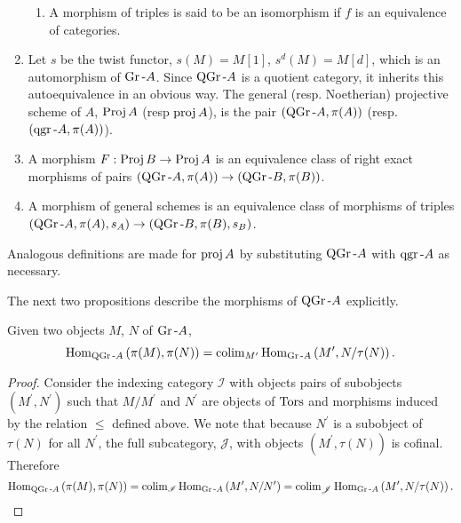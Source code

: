 \documentclass[dissertation.tex]{subfiles}
\begin{document}
\begin{defn}
\begin{enumerate}
\begin{enumerate}
    \item
      A morphism of triples is said to be an isomorphism if $f$ is an equivalence of categories.
    \end{enumerate}
  \item
    Let $s$ be the twist functor, $s(M) = M[1]$, $s^d(M) = M[d]$, which is an automorphism of $\operatorname{Gr}\text{-}A$.
    Since $\operatorname{QGr}\text{-}A$ is a quotient category, it inherits this autoequivalence in an obvious way.
    The general (resp. Noetherian) projective scheme of $A$, $\operatorname{Proj} A$ (resp $\operatorname{proj} A$), is the pair $(\operatorname{QGr}\text{-}A, \pi(A))$ (resp. $(\operatorname{qgr}\text{-}A, \pi(A))$).
  \item
    A morphism $F :\operatorname{Proj} B \rightarrow \operatorname{Proj} A$ is an equivalence class of right exact morphisms of pairs $(\operatorname{QGr}\text{-}A, \pi(A)) \rightarrow (\operatorname{QGr}\text{-}B, \pi(B))$.
  \item
    A morphism of general schemes is an equivalence class of morphisms of triples $(\operatorname{QGr}\text{-}A, \pi(A), s_A) \rightarrow (\operatorname{QGr}\text{-}B, \pi(B), s_B)$.
  \end{enumerate}
  Analogous definitions are made for $\operatorname{proj} A$ by substituting $\operatorname{QGr}\text{-}A$ with $\operatorname{qgr}\text{-}A$ as necessary.
\end{defn}

The next two propositions describe the morphisms of $\operatorname{QGr}\text{-}A$ explicitly.

\begin{prop}
  Given two objects $M$, $N$ of $\operatorname{Gr}\text{-}A$, 
  $$\operatorname{Hom}_{\operatorname{QGr}\text{-}A}\left(\pi(M), \pi(N)\right) = \operatorname{colim}_{M^\prime}\operatorname{Hom}_{\operatorname{Gr}\text{-}A}\left(M^\prime, N/\tau(N)\right).$$
  
  \begin{proof}
    Consider the indexing category $\mathscr{I}$ with objects pairs of subobjects $(M^\prime, N^\prime)$ such that $M/M^\prime$ and $N^\prime$ are objects of $\operatorname{Tors}$ and morphisms induced by the relation $\leq$ defined above.
    We note that because $N^\prime$ is a subobject of $\tau(N)$ for all $N^\prime$, the full subcategory, $\mathscr{J}$, with objects $(M^\prime, \tau(N))$ is cofinal.
    Therefore
    $$\operatorname{Hom}_{\operatorname{QGr}\text{-}A}\left(\pi(M), \pi(N)\right) = \operatorname{colim}_{\mathscr{I}}\operatorname{Hom}_{\operatorname{Gr}\text{-}A}\left(M^\prime, N/N^\prime\right) = \operatorname{colim}_{\mathscr{J}}\operatorname{Hom}_{\operatorname{Gr}\text{-}A}\left(M^\prime, N/\tau(N)\right).$$
  \end{proof}
\end{prop}
\end{document}

